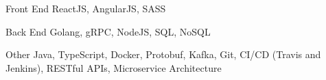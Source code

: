 


\begin{cvskills}


\cvskill
{Front End} %
{ReactJS, AngularJS, SASS} %


\cvskill
{Back End} %
{Golang, gRPC, NodeJS, SQL, NoSQL} %


\cvskill
{Other} %
{Java, TypeScript, Docker, Protobuf, Kafka, Git, CI/CD (Travis and Jenkins), RESTful APIs, Microservice Architecture} %


\end{cvskills}